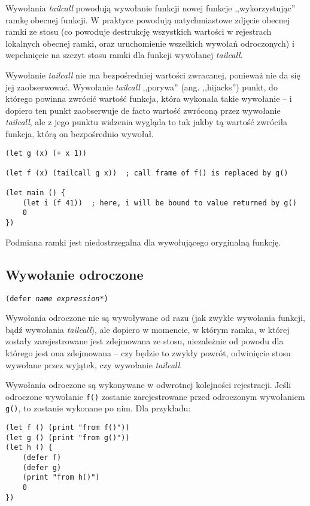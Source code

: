 Wywołania \emph{tailcall} powodują wywołanie funkcji nowej funkcje ,,wykorzystując'' ramkę obecnej funkcji.
W praktyce powodują natychmiastowe zdjęcie obecnej ramki ze stosu (co powoduje destrukcję wszystkich wartości
w rejestrach lokalnych obecnej ramki, oraz uruchomienie wszelkich wywołań odroczonych) i wepchnięcie na szczyt
stosu ramki dla funkcji wywołanej \emph{tailcall}.

Wywołanie \emph{tailcall} nie ma bezpośredniej wartości zwracanej, ponieważ nie da się jej zaobserwować.
Wywołanie \emph{tailcall} ,,porywa'' (ang. ,,hijacks'') punkt, do którego powinna zwrócić wartość funkcja,
która wykonała takie wywołanie -- i dopiero ten punkt zaobserwuje de facto wartość zwróconą przez wywołanie
\emph{tailcall}, ale z jego punktu widzenia wygląda to tak jakby tą wartość zwróciła funkcja, którą on
bezpośrednio wywołał.

\begin{lstlisting}
(let g (x) (+ x 1))

(let f (x) (tailcall g x))  ; call frame of f() is replaced by g()

(let main () {
    (let i (f 41))  ; here, i will be bound to value returned by g()
    0
})
\end{lstlisting}

Podmiana ramki jest niedostrzegalna dla wywołującego oryginalną funkcję.

\subsection{Wywołanie odroczone}
\label{viuact_spec_deferred_call}

\texttt{(defer \emph{name} \emph{expression}*)}
\newline

Wywołania odroczone nie są wywoływane od razu (jak zwykłe wywołania funkcji, bądź wywołania \emph{tailcall}),
ale dopiero w momencie, w którym ramka, w której zostały zarejestrowane jest zdejmowana ze stosu, niezależnie
od powodu dla którego jest ona zdejmowana -- czy będzie to zwykły powrót, odwinięcie stosu wywołane przez
wyjątek, czy wywołanie \emph{tailcall}.

Wywołania odroczone są wykonywane w odwrotnej kolejności rejestracji. Jeśli odroczone wywołanie \texttt{f()}
zostanie zarejestrowane przed odroczonym wywołaniem \texttt{g()}, to zostanie wykonane po nim. Dla przykładu:

\begin{lstlisting}
(let f () (print "from f()"))
(let g () (print "from g()"))
(let h () {
    (defer f)
    (defer g)
    (print "from h()")
    0
})
\end{lstlisting}

